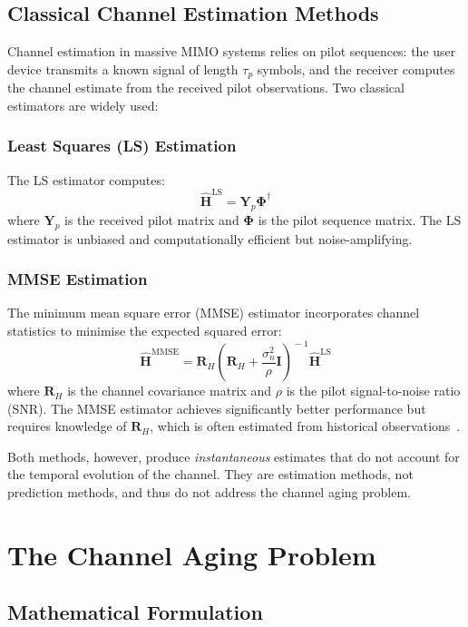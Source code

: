 \documentclass[12pt,a4paper]{article}
\newcommand{\bH}{\mathbf{H}}
\newcommand{\bR}{\mathbf{R}}
\newcommand{\bY}{\mathbf{Y}}
\newcommand{\bPhi}{\boldsymbol{\Phi}}
\newcommand{\bI}{\mathbf{I}}
\begin{document}
\subsection{Classical Channel Estimation Methods}

Channel estimation in massive MIMO systems relies on pilot sequences:
the user device transmits a known signal of length $\tau_p$ symbols,
and the receiver computes the channel estimate from the received pilot
observations. Two classical estimators are widely used:

\subsubsection{Least Squares (LS) Estimation}
The LS estimator computes:
\begin{equation}
  \hat{\bH}^{\mathrm{LS}} = \bY_p \bPhi^{\dagger}
\end{equation}
where $\bY_p$ is the received pilot matrix and $\bPhi$ is the pilot
sequence matrix. The LS estimator is unbiased and computationally
efficient but noise-amplifying.

\subsubsection{MMSE Estimation}
The minimum mean square error (MMSE) estimator incorporates channel
statistics to minimise the expected squared error:
\begin{equation}
  \hat{\bH}^{\mathrm{MMSE}} = \bR_H \!\left(\bR_H + \frac{\sigma_n^2}{\rho}\bI\right)^{\!-1}\!\hat{\bH}^{\mathrm{LS}}
\end{equation}
where $\bR_H$ is the channel covariance matrix and $\rho$ is the pilot
signal-to-noise ratio (SNR). The MMSE estimator achieves significantly
better performance but requires knowledge of $\bR_H$, which is often
estimated from historical observations~\cite{Li2025survey}.

Both methods, however, produce \textit{instantaneous} estimates that
do not account for the temporal evolution of the channel. They are
estimation methods, not prediction methods, and thus do not address
the channel aging problem.

\section{The Channel Aging Problem}

\subsection{Mathematical Formulation}
\end{document}
